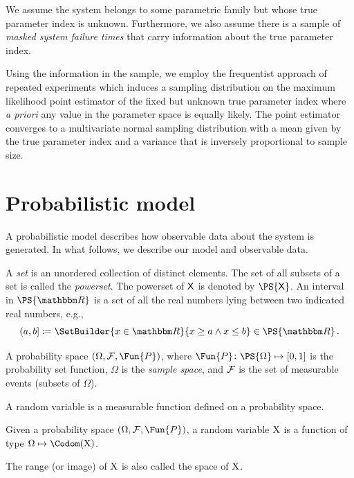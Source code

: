 \documentclass[
    11pt,
    extrafontsizes,
    article,
    oldfontcommands,
    final,
    oneside,
    openany,
    hidelinks]{memoir}
\begin{document}
We assume the system belongs to some parametric family but whose true parameter 
index is unknown. Furthermore, we also assume there is a sample of 
\emph{masked system failure times} that carry information about the true 
parameter index.

Using the information in the sample, we employ the frequentist approach of 
repeated experiments which induces a sampling distribution on the maximum 
likelihood point estimator of the fixed but unknown true parameter index where 
\emph{a priori} any value in the parameter space is equally likely. The point 
estimator converges to a multivariate normal sampling distribution with a mean 
given by the true parameter index and a variance that is inversely proportional 
to sample size.

\chapter{Probabilistic model}
\label{sec:general_series_system}

A probabilistic model describes how observable data about the system is generated.
In what follows, we describe our model and observable data.

A \emph{set} is an unordered collection of distinct elements.
The set of all subsets of a set is called the \emph{powerset}.
The powerset of $\Set{X}$ is denoted by $\PS{\Set{X}}$.
An interval in $\PS{\RealSet}$ is a set of all the real numbers lying between two indicated real numbers, e.g.,
\begin{equation}
	(a,b] \coloneqq \SetBuilder{x \in \RealSet}{x \geq a \land x \leq b} \in \PS{\RealSet}\,.
\end{equation}

\begin{definition}
A probability space $(\Omega, \FancySet{F}, \Fun{P})$, where $\Fun{P} \colon \PS{\Omega} \mapsto [0,1]$ is the probability set function, $\Omega$ is the \emph{sample space}, and $\FancySet{F}$ is the set of measurable events (subsets of $\Omega$).
\end{definition}


A random variable is a measurable function defined on a probability space.
\begin{definition}
Given a probability space $(\Omega, \FancySet{F}, \Fun{P})$, a random variable $\mathrm{X}$ is a function of type $\Omega \mapsto \Codom(\RV{X})$.
\end{definition}
The range (or image) of $\mathrm{X}$ is also called the space of $\mathrm{X}$.
\end{document}

